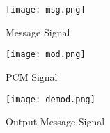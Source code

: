 \begin{figure}[H]
    \centering
    \texttt{[image: msg.png]}
    \caption{Message Signal}
    \label{fig:img2}
\end{figure}

\begin{figure}[H]
    \centering
    \texttt{[image: mod.png]}
    \caption{PCM Signal}
    \label{fig:img11}
\end{figure}

\begin{figure}[H]
    \centering
    \texttt{[image: demod.png]}
    \caption{Output Message Signal}
    \label{fig:img4}
\end{figure}
